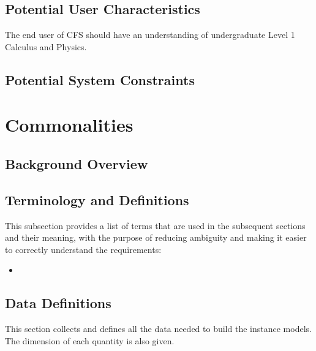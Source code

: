 \documentclass[12pt]{article}
\newcommand{\famname}{CFS} %
\begin{document}
\subsection{Potential User Characteristics} \label{SecUserCharacteristics}

The end user of \famname{} should have an understanding of undergraduate Level
1 Calculus and Physics.

\subsection{Potential System Constraints}


\section{Commonalities}

\subsection{Background Overview} \label{Sec_Background}

\subsection{Terminology and  Definitions}

This subsection provides a list of terms that are used in the subsequent
sections and their meaning, with the purpose of reducing ambiguity and making it
easier to correctly understand the requirements:

\begin{itemize}

\item 

\end{itemize}

\subsection{Data Definitions} \label{sec_datadef}

This section collects and defines all the data needed to build the instance
models. The dimension of each quantity is also given.  

~\newline
\end{document}
